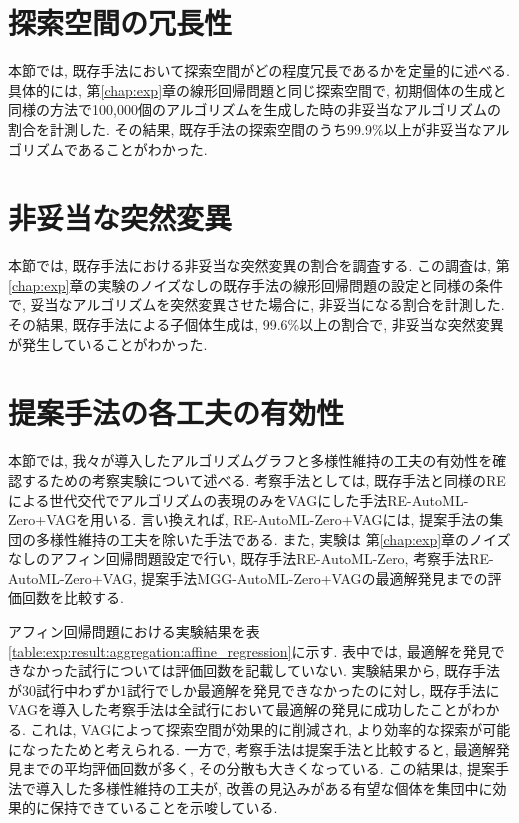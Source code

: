 \documentclass[11pt,oneside,openany,report]{jsbook}
\begin{document}
\section{探索空間の冗長性} \label{sec:consideration:redundancy}

本節では, 既存手法において探索空間がどの程度冗長であるかを定量的に述べる. 具体的には, 第\ref{chap:exp}章の線形回帰問題と同じ探索空間で, 初期個体の生成と同様の方法で100,000個のアルゴリズムを生成した時の非妥当なアルゴリズムの割合を計測した. その結果, 既存手法の探索空間のうち99.9\%以上が非妥当なアルゴリズムであることがわかった.

\section{非妥当な突然変異} \label{sec:consideration:invalid}

本節では, 既存手法における非妥当な突然変異の割合を調査する. この調査は, 第\ref{chap:exp}章の実験のノイズなしの既存手法の線形回帰問題の設定と同様の条件で, 妥当なアルゴリズムを突然変異させた場合に, 非妥当になる割合を計測した. その結果, 既存手法による子個体生成は, 99.6\%以上の割合で, 非妥当な突然変異が発生していることがわかった.

\section{提案手法の各工夫の有効性}

本節では, 我々が導入したアルゴリズムグラフと多様性維持の工夫の有効性を確認するための考察実験について述べる. 考察手法としては, 既存手法と同様のREによる世代交代でアルゴリズムの表現のみをVAGにした手法RE-AutoML-Zero+VAGを用いる. 言い換えれば, RE-AutoML-Zero+VAGには, 提案手法の集団の多様性維持の工夫を除いた手法である. また, 実験は 第\ref{chap:exp}章のノイズなしのアフィン回帰問題設定で行い, 既存手法RE-AutoML-Zero, 考察手法RE-AutoML-Zero+VAG, 提案手法MGG-AutoML-Zero+VAGの最適解発見までの評価回数を比較する.

アフィン回帰問題における実験結果を表\ref{table:exp:result:aggregation:affine_regression}に示す. 表中では, 最適解を発見できなかった試行については評価回数を記載していない. 実験結果から, 既存手法が30試行中わずか1試行でしか最適解を発見できなかったのに対し, 既存手法にVAGを導入した考察手法は全試行において最適解の発見に成功したことがわかる. これは, VAGによって探索空間が効果的に削減され, より効率的な探索が可能になったためと考えられる. 一方で, 考察手法は提案手法と比較すると, 最適解発見までの平均評価回数が多く, その分散も大きくなっている. この結果は, 提案手法で導入した多様性維持の工夫が, 改善の見込みがある有望な個体を集団中に効果的に保持できていることを示唆している.
\end{document}
